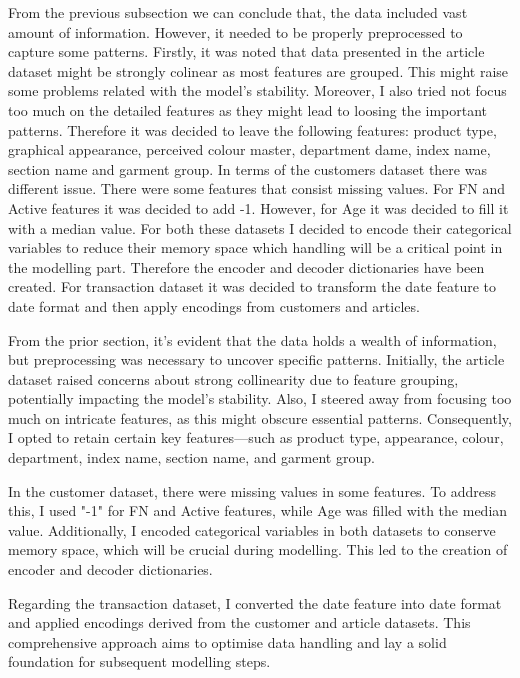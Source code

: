 \documentclass[conference,compsoc]{IEEEtran}
\begin{document}
From the previous subsection we can conclude that, the data included vast amount of information. However, it needed to be properly preprocessed to capture some patterns. Firstly, it was noted that data presented in the article dataset might be strongly colinear as most features are grouped. This might raise some problems related with the model's stability. Moreover, I also tried not focus too much on the detailed features as they might lead to loosing the important patterns. Therefore it was decided to leave the following features: product type, graphical appearance, perceived colour master, department dame, index name, section name and garment group. In terms of the customers dataset there was different issue. There were some features that consist missing values. For FN and Active features it was decided to add -1. However, for Age it was decided to fill it with a median value. For both these datasets I decided to encode their categorical variables to reduce their memory space which handling will be a critical point in the modelling part. Therefore the encoder and decoder dictionaries have been created.  For transaction dataset it was decided to transform the date feature to date format and then apply encodings from customers and articles. 

From the prior section, it's evident that the data holds a wealth of information, but preprocessing was necessary to uncover specific patterns. Initially, the article dataset raised concerns about strong collinearity due to feature grouping, potentially impacting the model's stability. Also, I steered away from focusing too much on intricate features, as this might obscure essential patterns. Consequently, I opted to retain certain key features—such as product type, appearance, colour, department, index name, section name, and garment group.

In the customer dataset, there were missing values in some features. To address this, I used "-1" for FN and Active features, while Age was filled with the median value. Additionally, I encoded categorical variables in both datasets to conserve memory space, which will be crucial during modelling. This led to the creation of encoder and decoder dictionaries.

Regarding the transaction dataset, I converted the date feature into date format and applied encodings derived from the customer and article datasets. This comprehensive approach aims to optimise data handling and lay a solid foundation for subsequent modelling steps.
\end{document}
